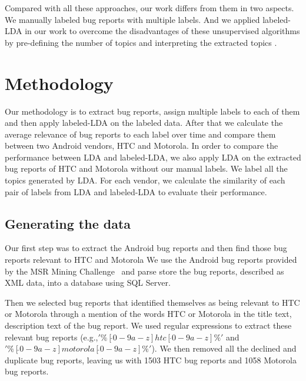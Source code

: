 \documentclass[10pt, conference, compsocconf]{IEEEtran}
\begin{document}
Compared with all these approaches, our work differs from them in two aspects. We manually labeled bug reports with multiple labels. And we applied labeled-LDA in our work to overcome the disadvantages of these unsupervised algorithms by pre-defining the number of topics and interpreting the extracted topics \cite{Asuncion:2010}.

\section{Methodology}

Our methodology is to extract bug reports, assign multiple labels to each of them and then apply labeled-LDA on the labeled data. After that we calculate the average relevance of bug reports to each label over time\cite{Hindle} and compare them between two Android vendors, HTC and Motorola. In order to compare the performance between LDA and labeled-LDA, we also apply LDA on the extracted bug reports of HTC and Motorola without our manual labels. We label all the topics generated by LDA. For each vendor, we calculate the similarity of each pair of labels from LDA and labeled-LDA to evaluate their performance.

\subsection{Generating the data}



Our first step was to extract the Android bug reports and then find
those bug reports relevant to HTC and Motorola
We use the Android bug reports provided by the MSR Mining
Challenge~\cite{MSRChallenge2012}
and parse store the bug reports, described as XML data, into a
database using SQL
Server. 

Then we selected bug reports that identified themselves as being
relevant to HTC or Motorola through a mention of the words HTC or
Motorola in the title text, description text of the bug report.  
We used regular expressions to extract these relevant bug reports (e.g.,$'\%[\hat{ }0-9a-z]htc[ \hat{ }0-9a-z]\%'$ and $'\%[ \hat{ }0-9a-z]motorola[ \hat{ }0-9a-z]\%'$).
We then removed all the declined and duplicate bug reports, leaving us
with 1503 HTC bug reports and 1058 Motorola bug reports.
\end{document}
